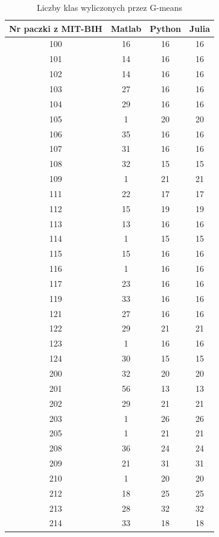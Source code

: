 \begin{table}[!tp]
	\centering
	\caption{Liczby klas wyliczonych przez G-means}
	\label{tabResults2}
	\begin{tabular}{|c|c|c|c|}
		\hline
		Nr paczki z MIT-BIH & Matlab & Python & Julia\\ \hline		
		100 & 16 & 16 & 16\\ \hline
		101 & 14 & 16 & 16\\ \hline
		102 & 14 & 16 & 16\\ \hline
		103 & 27 & 16 & 16\\ \hline
		104 & 29 & 16 & 16\\ \hline
		105 &  1 & 20 & 20\\ \hline
		106 & 35 & 16 & 16\\ \hline
		107 & 31 & 16 & 16\\ \hline
		108 & 32 & 15 & 15\\ \hline
		109 &  1 & 21 & 21\\ \hline
		111 & 22 & 17 & 17\\ \hline
		112 & 15 & 19 & 19\\ \hline
		113 & 13 & 16 & 16\\ \hline
		114 &  1 & 15 & 15\\ \hline
		115 & 15 & 16 & 16\\ \hline
		116 &  1 & 16 & 16\\ \hline
		117 & 23 & 16 & 16\\ \hline
		119 & 33 & 16 & 16\\ \hline
		121 & 27 & 16 & 16\\ \hline
		122 & 29 & 21 & 21\\ \hline
		123 &  1 & 16 & 16\\ \hline
		124 & 30 & 15 & 15\\ \hline
		200 & 32 & 20 & 20\\ \hline
		201 & 56 & 13 & 13\\ \hline
		202 & 29 & 21 & 21\\ \hline
		203 &  1 & 26 & 26\\ \hline
		205 &  1 & 21 & 21\\ \hline
		208 & 36 & 24 & 24\\ \hline
		209 & 21 & 31 & 31\\ \hline
		210 &  1 & 20 & 20\\ \hline
		212 & 18 & 25 & 25\\ \hline
		213 & 28 & 32 & 32\\ \hline
		214 & 33 & 18 & 18\\ \hline

\end{tabular}
\end{table}
